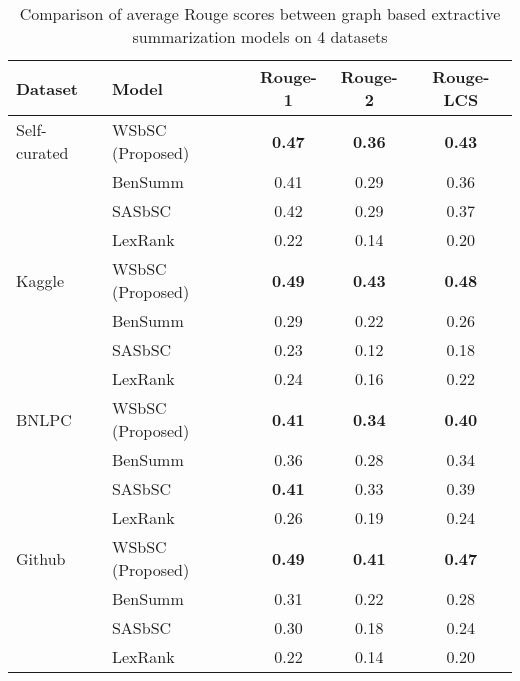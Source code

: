 \begin{table}[]
    \centering
    \begin{tabular}{llccc} \hline
Dataset 		& Model                                                & Rouge-1       & Rouge-2       & Rouge-LCS     \\\hline
Self-curated	& WSbSC (Proposed)                                     & \textbf{0.47} & \textbf{0.36} & \textbf{0.43} \\
         		& BenSumm \cite{chowdhury-etal-2021-tfidf-clustering}  & 0.41          & 0.29          & 0.36          \\
         		& SASbSC \cite{roychowdhury-etal-2022-spectral-base}   & 0.42          & 0.29          & 0.37          \\
         		& LexRank \cite{Erkan-lexRank-2004}                    & 0.22          & 0.14          & 0.20          \\\hline
Kaggle			& WSbSC (Proposed)                                     & \textbf{0.49} & \textbf{0.43} & \textbf{0.48} \\
         		& BenSumm \cite{chowdhury-etal-2021-tfidf-clustering}  & 0.29          & 0.22          & 0.26          \\
         		& SASbSC \cite{roychowdhury-etal-2022-spectral-base}   & 0.23          & 0.12          & 0.18          \\
         		& LexRank \cite{Erkan-lexRank-2004}                    & 0.24          & 0.16          & 0.22          \\\hline
BNLPC 			& WSbSC (Proposed)                                     & \textbf{0.41} & \textbf{0.34} & \textbf{0.40} \\
         		& BenSumm \cite{chowdhury-etal-2021-tfidf-clustering}  & 0.36          & 0.28          & 0.34          \\
         		& SASbSC \cite{roychowdhury-etal-2022-spectral-base}   & \textbf{0.41} & 0.33          & 0.39          \\
         		& LexRank \cite{Erkan-lexRank-2004}                    & 0.26          & 0.19          & 0.24          \\\hline
Github          & WSbSC (Proposed)                                     & \textbf{0.49} & \textbf{0.41} & \textbf{0.47} \\
         		& BenSumm \cite{chowdhury-etal-2021-tfidf-clustering}  & 0.31          & 0.22          & 0.28          \\
         		& SASbSC \cite{roychowdhury-etal-2022-spectral-base}   & 0.30          & 0.18          & 0.24          \\
         		& LexRank \cite{Erkan-lexRank-2004}                    & 0.22          & 0.14          & 0.20          \\\hline
    \end{tabular}
    \caption{Comparison of average Rouge scores between graph based extractive summarization models on 4 datasets}
    \label{tab:result_comparison-1}
\end{table}
